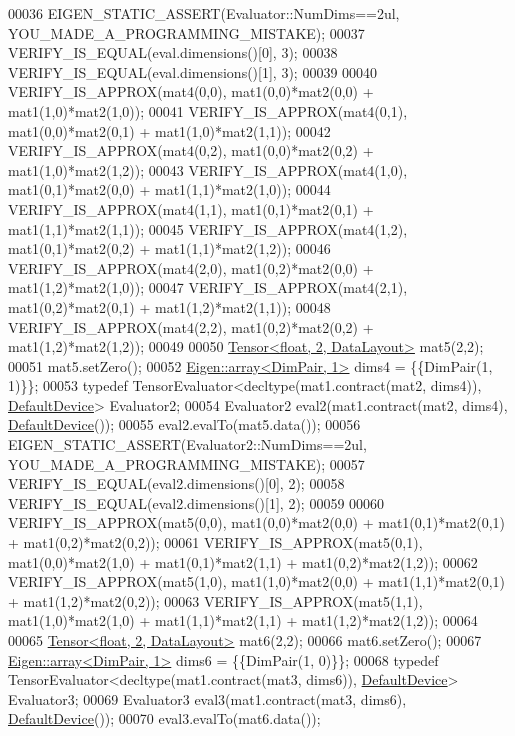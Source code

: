 \begin{DoxyCode}
00036   EIGEN\_STATIC\_ASSERT(Evaluator::NumDims==2ul, YOU\_MADE\_A\_PROGRAMMING\_MISTAKE);
00037   VERIFY\_IS\_EQUAL(eval.dimensions()[0], 3);
00038   VERIFY\_IS\_EQUAL(eval.dimensions()[1], 3);
00039 
00040   VERIFY\_IS\_APPROX(mat4(0,0), mat1(0,0)*mat2(0,0) + mat1(1,0)*mat2(1,0));
00041   VERIFY\_IS\_APPROX(mat4(0,1), mat1(0,0)*mat2(0,1) + mat1(1,0)*mat2(1,1));
00042   VERIFY\_IS\_APPROX(mat4(0,2), mat1(0,0)*mat2(0,2) + mat1(1,0)*mat2(1,2));
00043   VERIFY\_IS\_APPROX(mat4(1,0), mat1(0,1)*mat2(0,0) + mat1(1,1)*mat2(1,0));
00044   VERIFY\_IS\_APPROX(mat4(1,1), mat1(0,1)*mat2(0,1) + mat1(1,1)*mat2(1,1));
00045   VERIFY\_IS\_APPROX(mat4(1,2), mat1(0,1)*mat2(0,2) + mat1(1,1)*mat2(1,2));
00046   VERIFY\_IS\_APPROX(mat4(2,0), mat1(0,2)*mat2(0,0) + mat1(1,2)*mat2(1,0));
00047   VERIFY\_IS\_APPROX(mat4(2,1), mat1(0,2)*mat2(0,1) + mat1(1,2)*mat2(1,1));
00048   VERIFY\_IS\_APPROX(mat4(2,2), mat1(0,2)*mat2(0,2) + mat1(1,2)*mat2(1,2));
00049 
00050   \hyperlink{class_eigen_1_1_tensor}{Tensor<float, 2, DataLayout>} mat5(2,2);
00051   mat5.setZero();
00052   \hyperlink{class_eigen_1_1array}{Eigen::array<DimPair, 1>} dims4 = \{\{DimPair(1, 1)\}\};
00053   \textcolor{keyword}{typedef} TensorEvaluator<decltype(mat1.contract(mat2, dims4)), \hyperlink{struct_eigen_1_1_default_device}{DefaultDevice}> Evaluator2;
00054   Evaluator2 eval2(mat1.contract(mat2, dims4), \hyperlink{struct_eigen_1_1_default_device}{DefaultDevice}());
00055   eval2.evalTo(mat5.data());
00056   EIGEN\_STATIC\_ASSERT(Evaluator2::NumDims==2ul, YOU\_MADE\_A\_PROGRAMMING\_MISTAKE);
00057   VERIFY\_IS\_EQUAL(eval2.dimensions()[0], 2);
00058   VERIFY\_IS\_EQUAL(eval2.dimensions()[1], 2);
00059 
00060   VERIFY\_IS\_APPROX(mat5(0,0), mat1(0,0)*mat2(0,0) + mat1(0,1)*mat2(0,1) + mat1(0,2)*mat2(0,2));
00061   VERIFY\_IS\_APPROX(mat5(0,1), mat1(0,0)*mat2(1,0) + mat1(0,1)*mat2(1,1) + mat1(0,2)*mat2(1,2));
00062   VERIFY\_IS\_APPROX(mat5(1,0), mat1(1,0)*mat2(0,0) + mat1(1,1)*mat2(0,1) + mat1(1,2)*mat2(0,2));
00063   VERIFY\_IS\_APPROX(mat5(1,1), mat1(1,0)*mat2(1,0) + mat1(1,1)*mat2(1,1) + mat1(1,2)*mat2(1,2));
00064 
00065   \hyperlink{class_eigen_1_1_tensor}{Tensor<float, 2, DataLayout>} mat6(2,2);
00066   mat6.setZero();
00067   \hyperlink{class_eigen_1_1array}{Eigen::array<DimPair, 1>} dims6 = \{\{DimPair(1, 0)\}\};
00068   \textcolor{keyword}{typedef} TensorEvaluator<decltype(mat1.contract(mat3, dims6)), \hyperlink{struct_eigen_1_1_default_device}{DefaultDevice}> Evaluator3;
00069   Evaluator3 eval3(mat1.contract(mat3, dims6), \hyperlink{struct_eigen_1_1_default_device}{DefaultDevice}());
00070   eval3.evalTo(mat6.data());

\end{DoxyCode}
